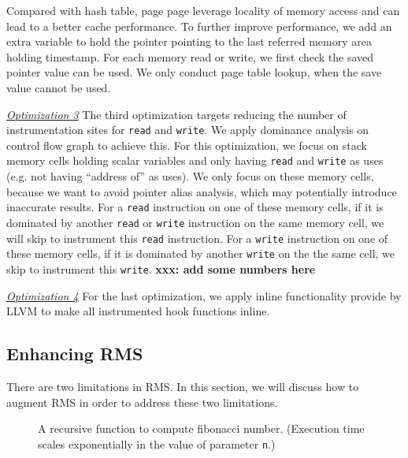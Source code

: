 {{Compared with hash table, 
page page leverage locality of memory access 
and can lead 
to a better cache performance. 
To further improve performance, 
we add an extra variable to hold the pointer pointing 
to the last referred memory area holding timestamp.
For each memory read or write, 
we first check the saved pointer value can be used. 
We only conduct page table lookup, when the save value cannot be used. 

{\underline{\textit{Optimization 3}}
The third optimization targets reducing the number of instrumentation sites 
for \texttt{read} and \texttt{write}. 
We apply dominance analysis on 
control flow graph to achieve this.
For this optimization, we focus on stack memory cells holding 
scalar variables and only having \texttt{read} and \texttt{write} as uses 
(e.g. not having ``address of'' as uses).
We only focus on these memory cells,
because we want to avoid pointer alias analysis, 
which may potentially introduce inaccurate results. 
For a \texttt{read} instruction on one of these memory cells, 
if it is dominated by another \texttt{read} or \texttt{write} instruction 
on the same memory cell, we will skip to instrument this \texttt{read} instruction.
For a \texttt{write} instruction on one of these memory cells, 
if it is dominated by another \texttt{write} on the the same cell, 
we skip to instrument this \texttt{write}. 
{\bf xxx: add some numbers here}

 
{\underline{\textit{Optimization 4}}
For the last optimization, we apply inline functionality 
provide by LLVM to make all instrumented hook functions inline.


\subsection{Enhancing RMS}
There are two limitations in RMS. 
In this section, we will discuss how to augment  
RMS in order to address these two limitations.


\begin{figure}
\centering
{}
  \mbox{}
\caption{A recursive function to compute fibonacci number. 
(Execution time scales exponentially in the value of parameter \texttt{n}.) }
\vspace{-0.05in}
\label{fig:fib}
\vspace{-0.05in}
\end{figure}

}}}}
